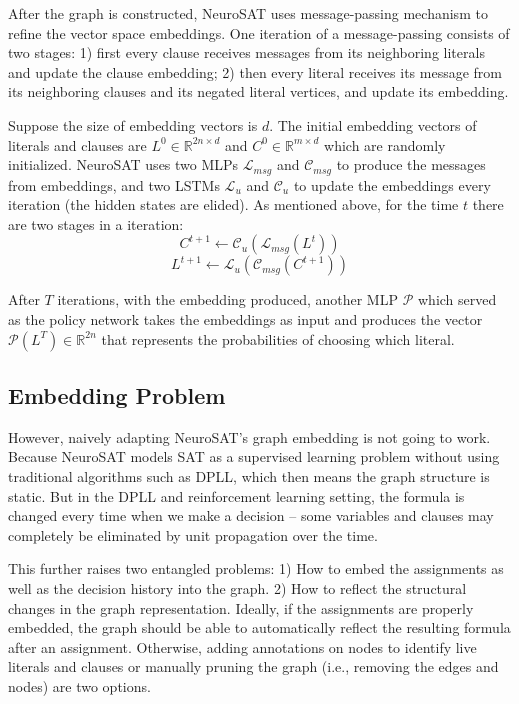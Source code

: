 \documentclass[sigplan,10pt]{acmart}\settopmatter{printfolios=true,printccs=false,printacmref=false}
\begin{document}
After the graph is constructed, NeuroSAT uses message-passing mechanism to refine the vector space embeddings.
One iteration of a message-passing consists of two stages:
1) first every clause receives messages from its neighboring literals and update the clause embedding;
2) then every literal receives its message from its neighboring clauses and its negated literal vertices,
and update its embedding.

Suppose the size of embedding vectors is $d$. The initial embedding vectors of literals and clauses 
are $L^{0} \in \mathbb{R}^{2n \times d}$ and $C^{0} \in \mathbb{R}^{m \times d}$ which are randomly initialized.
NeuroSAT uses two MLPs $\mathcal{L}_{msg}$ and $\mathcal{C}_{msg}$ to produce the messages from embeddings, 
and two LSTMs $\mathcal{L}_u$ and $\mathcal{C}_u$ to update the embeddings every iteration 
(the hidden states are elided). 
As mentioned above, for the time $t$ there are two stages in a iteration:
$$ C^{t+1} \leftarrow \mathcal{C}_u( \mathcal{L}_{msg}(L^t) ) $$
$$ L^{t+1} \leftarrow \mathcal{L}_u( \mathcal{C}_{msg}(C^{t+1}) ) $$

After $T$ iterations, with the embedding produced, another MLP $\mathcal{P}$ which served as the policy network takes 
the embeddings as input and produces the vector $\mathcal{P}(L^T) \in \mathbb{R}^{2n}$ that represents the probabilities of choosing which literal.

\subsection{Embedding Problem}

However, naively adapting NeuroSAT's graph embedding is not going to work.
Because NeuroSAT models SAT as a supervised learning problem without using traditional algorithms 
such as DPLL, which then means the graph structure is static. 
But in the DPLL and reinforcement learning setting, the formula is changed every time when we make a decision --
some variables and clauses may completely be eliminated by unit propagation over the time.

This further raises two entangled problems:
1) How to embed the assignments as well as the decision history into the graph.
2) How to reflect the structural changes in the graph representation. Ideally, if the assignments are properly 
embedded, the graph should be able to automatically reflect the resulting formula after an assignment. 
Otherwise, adding annotations on nodes to identify live literals and clauses or manually pruning the graph 
(i.e., removing the edges and nodes) are two options.
\end{document}
